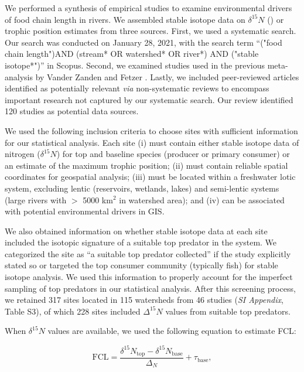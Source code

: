 \documentclass[11pt, class=article, crop=false]{standalone}
\begin{document}
We performed a synthesis of empirical studies to examine environmental drivers of food chain length in rivers.
We assembled stable isotope data on $\delta^{15} N$ (\textperthousand) or trophic position estimates from three sources.
First, we used a systematic search. 
Our search was conducted on January 28, 2021, with the search term ``("food chain length")AND (stream* OR watershed* OR river*) AND ("stable isotope*")'' in Scopus.
Second, we examined studies used in the previous meta-analysis by Vander Zanden and Fetzer \citep{vander_zanden_global_2007}.
Lastly, we included peer-reviewed articles identified as potentially relevant \textit{via} non-systematic reviews to encompass important research not captured by our systematic search.
Our review identified 120 studies as potential data sources.

We used the following inclusion criteria to choose sites with sufficient information for our statistical analysis.
Each site (i) must contain either stable isotope data of nitrogen ($\delta^{15}N$) for top and baseline species (producer or primary consumer) or an estimate of the maximum trophic position; 
(ii) must contain reliable spatial coordinates for geospatial analysis; 
(iii) must be located within a freshwater lotic system, excluding lentic (reservoirs, wetlands, lakes) and semi-lentic systems (large rivers with $>$ 5000 km$^2$ in watershed area); and (iv) can be associated with potential environmental drivers in GIS.

We also obtained information on whether stable isotope data at each site included the isotopic signature of a suitable top predator in the system.
We categorized the site as ``a suitable top predator collected'' if the study explicitly stated so or targeted the top consumer community (typically fish) for stable isotope analysis.
We used this information to properly account for the imperfect sampling of top predators in our statistical analysis.
After this screening process, we retained 317 sites located in 115 watersheds from 46 studies (\textit{SI Appendix}, Table S3), of which 228 sites included $\Delta^{15}N$ values from suitable top predators. 

When $\delta^{15}N$ values are available, we used the following equation to estimate FCL:

\begin{equation}
    \mbox{FCL} = \frac{\delta^{15}N_{\text{top}} - \delta^{15}N_{\text{base}}}{\Delta_N} + \tau_{\text{base}},
    \label{eq:fcl-si}
\end{equation}
\end{document}
